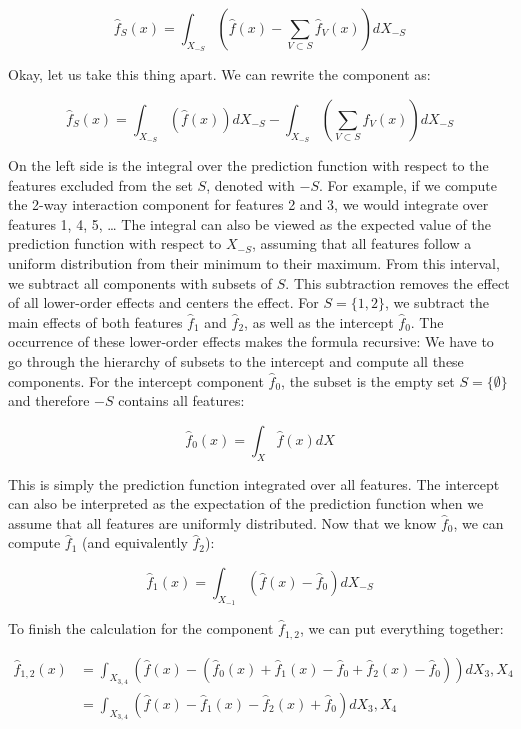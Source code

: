 \documentclass[
  11pt,
]{scrbook}
\begin{document}
\[\hat{f}_S(x) = \int_{X_{-S}} \left( \hat{f}(x) - \sum_{V \subset S} \hat{f}_V(x)\right) d X_{-S}\]

Okay, let us take this thing apart.
We can rewrite the component as:

\[\hat{f}_S(x) = \int_{X_{-S}} \left( \hat{f}(x)\right) d X_{-S} - \int_{X_{-S}} \left(\sum_{V \subset S} \hat{f}_V(x) \right) d X_{-S}\]

On the left side is the integral over the prediction function with respect to the features excluded from the set \(S\), denoted with \(-S\).
For example, if we compute the 2-way interaction component for features 2 and 3, we would integrate over features 1, 4, 5, \ldots{}
The integral can also be viewed as the expected value of the prediction function with respect to \(X_{-S}\), assuming that all features follow a uniform distribution from their minimum to their maximum.
From this interval, we subtract all components with subsets of \(S\).
This subtraction removes the effect of all lower-order effects and centers the effect.
For \(S=\{1,2\}\), we subtract the main effects of both features \(\hat{f}_1\) and \(\hat{f}_2\), as well as the intercept \(\hat{f}_0\).
The occurrence of these lower-order effects makes the formula recursive:
We have to go through the hierarchy of subsets to the intercept and compute all these components.
For the intercept component \(\hat{f}_0\), the subset is the empty set \(S=\{\emptyset\}\) and therefore \(-S\) contains all features:

\[\hat{f}_0(x) = \int_{X} \hat{f}(x) dX\]

This is simply the prediction function integrated over all features.
The intercept can also be interpreted as the expectation of the prediction function when we assume that all features are uniformly distributed.
Now that we know \(\hat{f}_0\), we can compute \(\hat{f}_1\) (and equivalently \(\hat{f}_2\)):

\[\hat{f}_1(x) = \int_{X_{-1}} \left( \hat{f}(x) - \hat{f}_0\right) d X_{-S}\]

To finish the calculation for the component \(\hat{f}_{1,2}\), we can put everything together:

\begin{align*}\hat{f}_{1,2}(x) &= \int_{X_{3,4}} \left( \hat{f}(x) - (\hat{f}_0(x) + \hat{f}_1(x) - \hat{f}_0 + \hat{f}_2(x) - \hat{f}_0)\right) d X_{3},X_4 \\  &= \int_{X_{3,4}} \left(\hat{f}(x) - \hat{f}_1(x) - \hat{f}_2(x) + \hat{f}_0\right) d X_{3},X_4 \end{align*}
\end{document}
